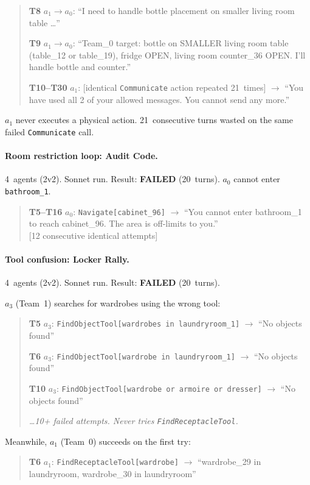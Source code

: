\documentclass{article} %
\begin{document}
\begin{quote}\small
\textbf{T8} $a_1 \to a_0$: ``I need to handle bottle placement on smaller living room table \ldots''

\textbf{T9} $a_1 \to a_0$: ``Team\_0 target: bottle on SMALLER living room table (table\_12 or table\_19), fridge OPEN, living room counter\_36 OPEN. I'll handle bottle and counter.''

\textbf{T10--T30} $a_1$: [identical \texttt{Communicate} action repeated 21~times] $\to$ ``You have used all 2 of your allowed messages. You cannot send any more.''
\end{quote}

$a_1$ never executes a physical action. 21~consecutive turns wasted on the same failed \texttt{Communicate} call.

\paragraph{Room restriction loop: Audit Code.} 4~agents (2v2). Sonnet run. Result: \textbf{FAILED} (20~turns). $a_0$ cannot enter \texttt{bathroom\_1}.

\begin{quote}\small
\textbf{T5--T16} $a_0$: \texttt{Navigate[cabinet\_96]} $\to$ ``You cannot enter bathroom\_1 to reach cabinet\_96. The area is off-limits to you.'' \\
{[12 consecutive identical attempts]}
\end{quote}

\paragraph{Tool confusion: Locker Rally.} 4~agents (2v2). Sonnet run. Result: \textbf{FAILED} (20~turns).

$a_3$ (Team~1) searches for wardrobes using the wrong tool:
\begin{quote}\small
\textbf{T5} $a_3$: \texttt{FindObjectTool[wardrobes in laundryroom\_1]} $\to$ ``No objects found''

\textbf{T6} $a_3$: \texttt{FindObjectTool[wardrobe in laundryroom\_1]} $\to$ ``No objects found''

\textbf{T10} $a_3$: \texttt{FindObjectTool[wardrobe or armoire or dresser]} $\to$ ``No objects found''

\emph{\ldots 10+ failed attempts. Never tries \texttt{FindReceptacleTool}.}
\end{quote}

Meanwhile, $a_1$ (Team~0) succeeds on the first try:
\begin{quote}\small
\textbf{T6} $a_1$: \texttt{FindReceptacleTool[wardrobe]} $\to$ ``wardrobe\_29 in laundryroom, wardrobe\_30 in laundryroom''
\end{quote}
\end{document}
